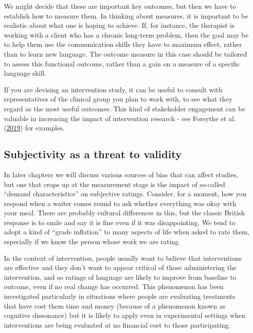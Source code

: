 \documentclass{krantz}
\begin{document}
We might decide that these are important key outcomes, but then we have to establish how to measure them. In thinking about measures, it is important to be realistic about what one is hoping to achieve. If, for instance, the therapist is working with a client who has a chronic long-term problem, then the goal may be to help them use the communication skills they have to maximum effect, rather than to learn new language. The outcome measure in this case should be tailored to assess this functional outcome, rather than a gain on a measure of a specific language skill.

If you are devising an intervention study, it can be useful to consult with representatives of the clinical group you plan to work with, to see what they regard as the most useful outcomes. This kind of stakeholder engagement can be valuable in increasing the impact of intervention research - see Forsythe et al. (\protect\hyperlink{ref-forsythe2019}{2019}) for examples.

\hypertarget{subjectivity-as-a-threat-to-validity}{%
\subsection{Subjectivity as a threat to validity}\label{subjectivity-as-a-threat-to-validity}}

In later chapters we will discuss various sources of bias that can affect studies, but one that crops up at the measurement stage is the impact of so-called ``demand characteristics'' on subjective ratings. Consider, for a moment, how you respond when a waiter comes round to ask whether everything was okay with your meal. There are probably cultural differences in this, but the classic British response is to smile and say it is fine even if it was disappointing. We tend to adopt a kind of ``grade inflation'' to many aspects of life when asked to rate them, especially if we know the person whose work we are rating.

In the context of intervention, people usually want to believe that interventions are effective and they don't want to appear critical of those administering the intervention, and so ratings of language are likely to improve from baseline to outcome, even if no real change has occurred. This phenomenon has been investigated particularly in situations where people are evaluating treatments that have cost them time and money (because of a phenomenon known as cognitive dissonance) but it is likely to apply even in experimental settings when interventions are being evaluated at no financial cost to those participating.
\end{document}
